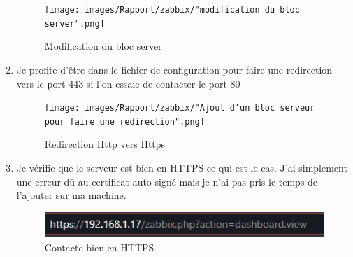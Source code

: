 \documentclass[a4paper]{article}
\begin{document}
\begin{enumerate}
\begin{figure}[H]
    \centering
    \texttt{[image: images/Rapport/zabbix/"modification du bloc server".png]}
    \caption{Modification du bloc server}
  \end{figure}
  \item Je profite d'être dans le fichier de configuration pour faire une redirection vers le port 443 si l'on essaie de contacter le port 80
  \begin{figure}[H]
    \centering
    \texttt{[image: images/Rapport/zabbix/"Ajout d'un bloc serveur pour faire une redirection".png]}
    \caption{Redirection Http vers Https}
  \end{figure}
  \item Je vérifie que le serveur est bien en HTTPS ce qui est le cas. J'ai simplement une erreur dû au certificat auto-signé mais je n'ai pas pris le temps de l'ajouter sur ma machine.
  \begin{figure}[H]
    \centering
    \includegraphics[width=12cm]{images/Rapport/zabbix/auto.png}
    \caption{Contacte bien en HTTPS}
  \end{figure}
\end{enumerate}
\end{document}
